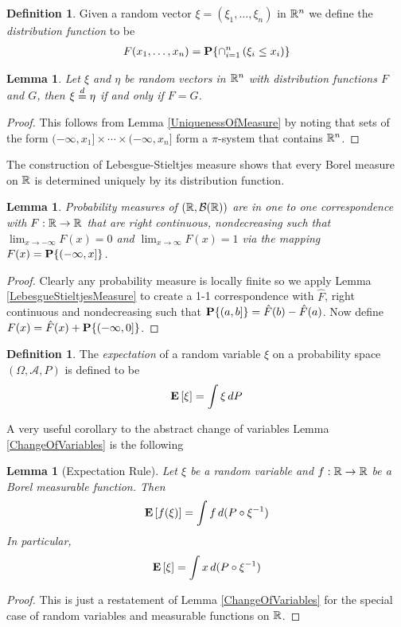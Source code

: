 \documentclass{amsart}
\newtheorem{lem}[thm]{Lemma}
\theoremstyle{remark}
\theoremstyle{definition}
\newtheorem{defn}[thm]{Definition}
\begin{document}
\begin{defn}Given a random vector $\xi = (\xi_1, \dots, \xi_n)$ in
  $\mathbb{R}^n$ we define the \emph{distribution function} to be 
\begin{align*}
F(x_1, \dots, x_n) = \textbf{P}\{\cap_{i=1}^n \left ( \xi_i \leq x_i
    \right ) \}
\end{align*}
\end{defn}
\begin{lem}Let $\xi$ and $\eta$ be random vectors in $\mathbb{R}^n$ with
  distribution functions $F$ and $G$, then
  $\xi \overset{d}= \eta$ if and only if $F = G$.
\end{lem}
\begin{proof}This follows from Lemma \ref{UniquenessOfMeasure} by
  noting
  that sets of the form $(-\infty, x_1] \times \cdots \times (-\infty,
  x_n]$ form a $\pi$-system that contains $\mathbb{R}^n$.
\end{proof}

The construction of Lebesgue-Stieltjes measure shows that every
Borel measure on $\mathbb{R}$ is determined uniquely by its distribution function.
\begin{lem}Probability measures of $(\mathbb{R}, \mathcal{B}(\mathbb{R}))$ are
  in one to one correspondence with $F : \mathbb{R} \to \mathbb{R}$ that are
  right continuous, nondecreasing such that $\lim_{x \to -\infty} F(x)
  = 0$ and $\lim_{x \to \infty} F(x) = 1$ via the mapping $F(x) =
  \textbf{P}\{(-\infty, x]\}$.
\end{lem}
\begin{proof}Clearly any probability measure is locally finite so we
  apply Lemma \ref{LebesgueStieltjesMeasure} to create a 1-1
  correspondence with $\hat{F}$, 
  right continuous and nondecreasing such that $\textbf{P}\{(a,b]\} =
  \hat{F}(b) - \hat{F}(a)$.  Now define $F(x) = \hat{F}(x) +
  \textbf{P}\{(-\infty, 0]\}$.
\end{proof}

\begin{defn}The \emph{expectation} of a random variable $\xi$ on a
  probability space $(\Omega, \mathcal{A}, P)$ is
  defined to be 
\begin{align*}
\textbf{E}\left[\xi\right] = \int \xi \, dP
\end{align*}
\end{defn}
A very useful corollary to the abstract change of variables Lemma
\ref{ChangeOfVariables} is the following
\begin{lem}[Expectation Rule]\label{ExpectationRule}Let $\xi$ be a random variable and $f: \mathbb{R} \to \mathbb{R}$
  be a Borel measurable function.  Then 
\begin{align*}
\textbf{E}\left[f(\xi)\right] = \int f \, d (P \circ \xi^{-1})
\end{align*}
In particular, 
\begin{align*}
\textbf{E}\left[\xi\right] = \int x \, d (P \circ \xi^{-1})
\end{align*}
\end{lem}
\begin{proof}This is just a restatement of Lemma
  \ref{ChangeOfVariables} for the special case of random variables and
  measurable functions on $\mathbb{R}$.
\end{proof}
\end{document}
